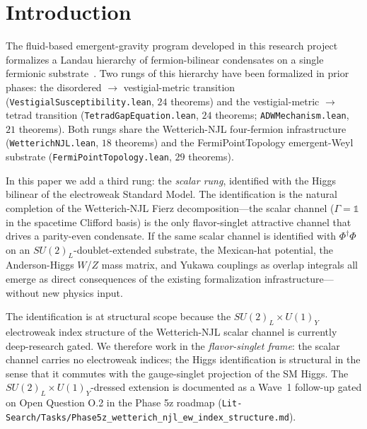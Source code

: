 \documentclass[aps,prd,twocolumn,showpacs,superscriptaddress,nofootinbib]{revtex4-2}
\newcommand{\HiggsField}{\Phi}
\begin{document}
\maketitle

\section{Introduction}
\label{sec:intro}

The fluid-based emergent-gravity program developed in this research
project formalizes a Landau hierarchy of fermion-bilinear condensates
on a single fermionic substrate~\cite{ADW,WetterichSpinor2013,WetterichSpinor2022,Volovik2024}.
Two rungs of this hierarchy have been formalized in prior phases:
the disordered $\to$ vestigial-metric transition
(\texttt{VestigialSusceptibility.lean}, $24$ theorems) and the
vestigial-metric $\to$ tetrad transition
(\texttt{TetradGapEquation.lean}, $24$ theorems;
\texttt{ADWMechanism.lean}, $21$ theorems). Both rungs share the
Wetterich-NJL four-fermion infrastructure
(\texttt{WetterichNJL.lean}, $18$ theorems) and the FermiPointTopology
emergent-Weyl substrate (\texttt{FermiPointTopology.lean}, $29$ theorems).

In this paper we add a third rung: the \emph{scalar rung}, identified
with the Higgs bilinear of the electroweak Standard Model. The
identification is the natural completion of the Wetterich-NJL Fierz
decomposition---the scalar channel ($\Gamma = \mathbb{1}$ in the
spacetime Clifford basis) is the only flavor-singlet attractive channel
that drives a parity-even condensate. If the same scalar channel is
identified with $\HiggsField^\dagger \HiggsField$ on an
$SU(2)_L$-doublet-extended substrate, the Mexican-hat potential, the
Anderson-Higgs $W$/$Z$ mass matrix, and Yukawa couplings as overlap
integrals all emerge as direct consequences of the existing formalization
infrastructure---without new physics input.

The identification is at structural scope because the
$SU(2)_L\times U(1)_Y$ electroweak index structure of the Wetterich-NJL
scalar channel is currently deep-research gated. We therefore work
in the \emph{flavor-singlet frame}: the scalar channel carries no
electroweak indices; the Higgs identification is structural in the sense
that it commutes with the gauge-singlet projection of the SM Higgs.
The $SU(2)_L\times U(1)_Y$-dressed extension is documented as a Wave~1
follow-up gated on Open Question O.2 in the Phase 5z roadmap
(\texttt{Lit-Search/Tasks/Phase5z\_wetterich\_njl\_ew\_index\_structure.md}).
\end{document}

